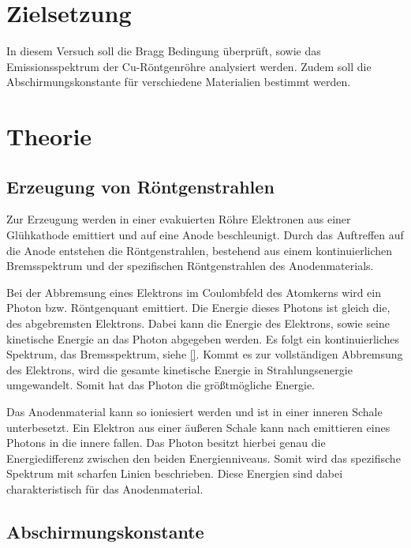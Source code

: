 \section{Zielsetzung}
\label{sec:Zielsetzung}
In diesem Versuch soll die Bragg Bedingung überprüft, sowie das Emissionsspektrum der Cu-Röntgenröhre analysiert werden.
Zudem soll die Abschirmungskonstante für verschiedene Materialien bestimmt werden.

\section{Theorie}
\label{sec:Theorie}

\subsection{Erzeugung von Röntgenstrahlen}
\label{subsec:Erzeugung}

Zur Erzeugung werden in einer evakuierten Röhre Elektronen aus einer Glühkathode emittiert und auf eine Anode beschleunigt.
Durch das Auftreffen auf die Anode entstehen die Röntgenstrahlen, bestehend aus einem kontinuierlichen Bremsspektrum und
der spezifischen Röntgenstrahlen des Anodenmaterials.

\noindent
Bei der Abbremsung eines Elektrons im Coulombfeld des Atomkerns wird ein Photon bzw. Röntgenquant emittiert.
Die Energie dieses Photons ist gleich die, des abgebremsten Elektrons.
Dabei kann die Energie des Elektrons, sowie seine kinetische Energie an das Photon abgegeben werden.
Es folgt ein kontinuierliches Spektrum, das Bremsspektrum, siehe \autoref{}.
Kommt es zur vollständigen Abbremsung des Elektrons, wird die gesamte kinetische Energie in Strahlungsenergie umgewandelt.
Somit hat das Photon die größtmögliche Energie.

\noindent
Das Anodenmaterial kann so ioniesiert werden und ist in einer inneren Schale unterbesetzt.
Ein Elektron aus einer äußeren Schale kann nach emittieren eines Photons in die innere fallen.
Das Photon besitzt hierbei genau die Energiedifferenz zwischen den beiden Energienniveaus.
Somit wird das spezifische Spektrum mit scharfen Linien beschrieben.
Diese Energien sind dabei charakteristisch für das Anodenmaterial.

\subsection{Abschirmungskonstante}
\label{subsec:Abschirmungskonstante}

